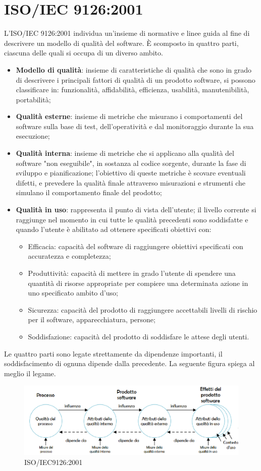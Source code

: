 \section{ISO/IEC 9126:2001}

L'ISO/IEC 9126:2001 individua un'insieme di normative e linee guida al fine di descrivere un modello di qualità del software. \`E scomposto in quattro parti, ciascuna delle quali si occupa di un diverso ambito. 
\begin{itemize}
	\item \textbf{Modello di qualità}: insieme di caratteristiche di qualità che sono in grado di descrivere i principali fattori di qualità di un prodotto software, si possono classificare in: funzionalità, affidabilità, efficienza, usabilità, manutenibilità, portabilità;
	\item \textbf{Qualità esterne}: insieme di metriche che misurano i comportamenti del software sulla base di test, dell'operatività e dal monitoraggio durante la sua esecuzione;
	\item \textbf{Qualità interna}: insieme di metriche che si applicano alla qualità del software "non eseguibile", in sostanza al codice sorgente, durante la fase di sviluppo e pianificazione; l'obiettivo di queste metriche è scovare eventuali difetti, e prevedere la qualità finale attraverso misurazioni e strumenti che simulano il comportamento finale del prodotto;
	\item \textbf{Qualità in uso}: rappresenta il punto di vista dell'utente; il livello corrente si raggiunge nel momento in cui tutte le qualità precedenti sono soddisfatte e quando l'utente è abilitato ad ottenere specificati obiettivi con:
	\begin{itemize}
		\item Efficacia: capacità del software di raggiungere obiettivi specificati con accuratezza e completezza;
		\item Produttività: capacità di mettere in grado l'utente di spendere una quantità di risorse appropriate per compiere una determinata azione in uno specificato ambito d'uso;
		\item Sicurezza: capacità del prodotto di raggiungere accettabili livelli di rischio per il software, apparecchiatura, persone;
		\item Soddisfazione: capacità del prodotto di soddisfare le attese degli utenti.
	\end{itemize}	
\end{itemize}
Le quattro parti sono legate strettamente da dipendenze importanti, il soddisfacimento di ognuna dipende dalla precedente. La seguente figura spiega al meglio il legame.

\begin{figure}[H]
\centering

	\includegraphics[width=0.9\linewidth]{./images/quality_cicle_iso9126.png} 
	\caption{ISO/IEC9126:2001}
	\label{ISO/IEC9126:2001}	

\end{figure}

 